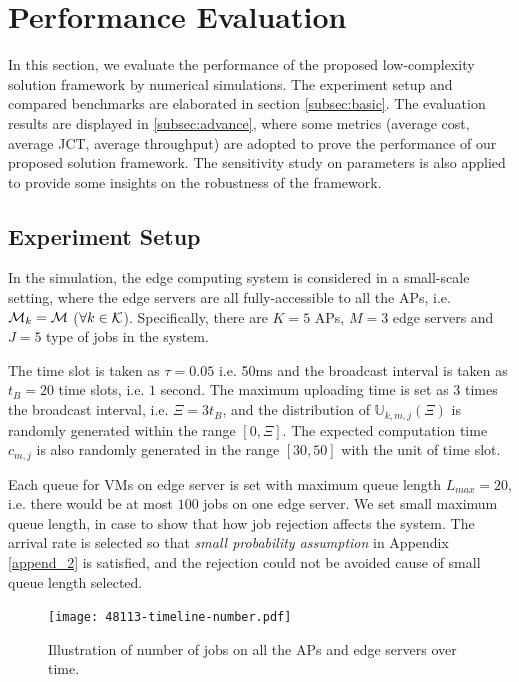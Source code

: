 \section{Performance Evaluation}
\label{sec:evaluation}
In this section, we evaluate the performance of the proposed low-complexity solution framework by numerical simulations.
The experiment setup and compared benchmarks are elaborated in section \ref{subsec:basic}.
The evaluation results are displayed in \ref{subsec:advance}, where some metrics (average cost, average JCT, average throughput) are adopted to prove the performance of our proposed solution framework.
The sensitivity study on parameters is also applied to provide some insights on the robustness of the framework.

\subsection{Experiment Setup}
\label{subsec:setup}
In the simulation, the edge computing system is considered in a small-scale setting, where the edge servers are all fully-accessible to all the APs, i.e. $\mathcal{M}_{k}=\mathcal{M}$ ($\forall k\in\mathcal{K}$). 
Specifically, there are $K=5$ APs, $M=3$ edge servers and $J=5$ type of jobs in the system.

The time slot is taken as $\tau = 0.05$ i.e. 50ms and the broadcast interval is taken as $t_{B}=20$ time slots, i.e. $1$ second.
The maximum uploading time is set as $3$ times the broadcast interval, i.e. $\Xi = 3t_B$, and the distribution of $\mathbb{U}_{k,m,j}(\Xi)$ is randomly generated within the range $[0, \Xi]$.
The expected computation time $c_{m,j}$ is also randomly generated in the range $[30,50]$ with the unit of time slot.

Each queue for VMs on edge server is set with maximum queue length $L_{max}=20$, i.e. there would be at most $100$ jobs on one edge server.
We set small maximum queue length, in case to show that how job rejection affects the system.
The arrival rate is selected so that \emph{small probability assumption} in Appendix \ref{append_2} is satisfied, and the rejection could not be avoided cause of small queue length selected.

\begin{figure}[ht!]                                                                            %
    \centering                                                                                  %
    \texttt{[image: 48113-timeline-number.pdf]}                           %
    \caption{Illustration of number of jobs on all the APs and edge servers over time.}     %
    \label{fig:general_timeline}                                                                %
\end{figure}                                                                                   %

